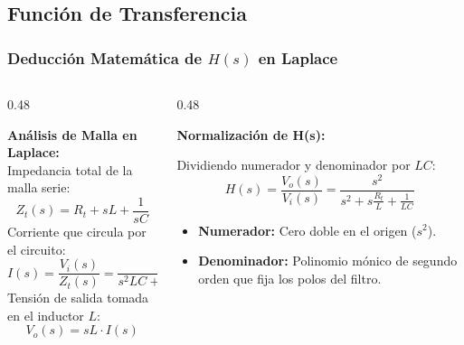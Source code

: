 \documentclass[aspectratio=169, 10pt]{beamer}
\begin{document}
\subsection{Función de Transferencia}
\begin{frame}
  \frametitle{Deducción Matemática de $H(s)$ en Laplace}

  \begin{columns}[t, onlytextwidth]
    \begin{column}{0.48\textwidth}
      \begin{tarjeta}
        {\fontsize{9pt}{11pt}\selectfont \textbf{\color{NavyDark} Análisis de Malla en Laplace:}}\\[2pt]
        {\fontsize{8pt}{10pt}\selectfont
        Impedancia total de la malla serie:
        \[ Z_t(s) = R_t + sL + \frac{1}{sC} \]
        Corriente que circula por el circuito:
        \[ I(s) = \frac{V_i(s)}{Z_t(s)} = \frac{sC}{s^2 LC + sR_t C + 1} V_i(s) \]
        Tensión de salida tomada en el inductor $L$:
        \[ V_o(s) = sL \cdot I(s) \]
        }
      \end{tarjeta}
    \end{column}

    \begin{column}{0.48\textwidth}
      \begin{tarjeta}
        {\fontsize{9pt}{11pt}\selectfont \textbf{\color{NavyDark} Normalización de H(s):}}\\[2pt]
        {\fontsize{8pt}{10pt}\selectfont
        Dividiendo numerador y denominador por $LC$:
        \[ H(s) = \frac{V_o(s)}{V_i(s)} = \frac{s^2}{s^2 + s \frac{R_t}{L} + \frac{1}{LC}} \]
        \begin{itemize}\setlength{\itemsep}{2pt}
          \item \textbf{Numerador:} Cero doble en el origen ($s^2$).
          \item \textbf{Denominador:} Polinomio mónico de segundo orden que fija los polos del filtro.
        \end{itemize}
        }
      \end{tarjeta}
    \end{column}
  \end{columns}
\end{frame}

\end{document}
